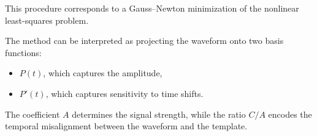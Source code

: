 \documentclass{article}
\begin{document}
This procedure corresponds to a Gauss--Newton minimization of the nonlinear least-squares problem.


The method can be interpreted as projecting the waveform onto two basis functions:
\begin{itemize}
    \item $P(t)$, which captures the amplitude,
    \item $P'(t)$, which captures sensitivity to time shifts.
\end{itemize}

The coefficient $A$ determines the signal strength, while the ratio $C/A$ encodes the temporal misalignment between the waveform and the template.
\end{document}
